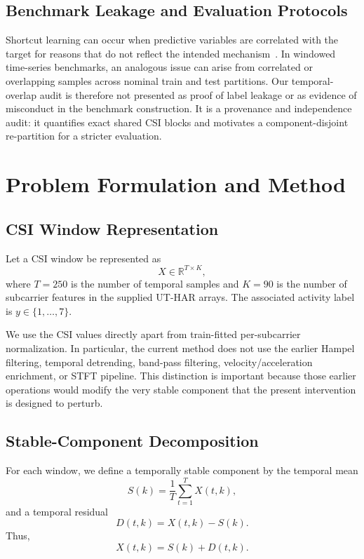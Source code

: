 \documentclass[runningheads]{llncs}
\begin{document}
\subsection{Benchmark Leakage and Evaluation Protocols}

Shortcut learning can occur when predictive variables are correlated with the target for reasons that do not reflect the intended mechanism~\cite{geirhos2020shortcut}. In windowed time-series benchmarks, an analogous issue can arise from correlated or overlapping samples across nominal train and test partitions. Our temporal-overlap audit is therefore not presented as proof of label leakage or as evidence of misconduct in the benchmark construction. It is a provenance and independence audit: it quantifies exact shared CSI blocks and motivates a component-disjoint re-partition for a stricter evaluation.

\section{Problem Formulation and Method}

\subsection{CSI Window Representation}

Let a CSI window be represented as
\begin{equation}
    X \in \mathbb{R}^{T\times K},
\end{equation}
where $T=250$ is the number of temporal samples and $K=90$ is the number of subcarrier features in the supplied UT-HAR arrays. The associated activity label is $y\in\{1,\ldots,7\}$.

We use the CSI values directly apart from train-fitted per-subcarrier normalization. In particular, the current method does not use the earlier Hampel filtering, temporal detrending, band-pass filtering, velocity/acceleration enrichment, or STFT pipeline. This distinction is important because those earlier operations would modify the very stable component that the present intervention is designed to perturb.

\subsection{Stable-Component Decomposition}

For each window, we define a temporally stable component by the temporal mean
\begin{equation}
    S(k)=\frac{1}{T}\sum_{t=1}^{T}X(t,k),
\end{equation}
and a temporal residual
\begin{equation}
    D(t,k)=X(t,k)-S(k).
\end{equation}
Thus,
\begin{equation}
    X(t,k)=S(k)+D(t,k).
\end{equation}
\end{document}
